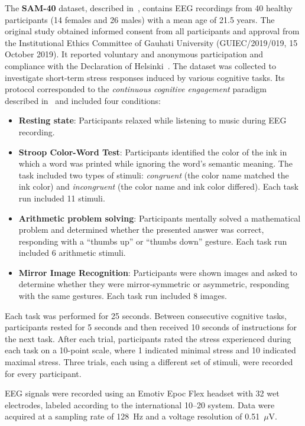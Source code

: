 \documentclass[10pt,letterpaper]{article}
\begin{document}
The \textbf{SAM-40} dataset, described in~\cite{ghosh2022sam40}, contains EEG recordings from 40 healthy participants (14 females and 26 males) with a mean age of 21.5 years. The original study obtained informed consent from all participants and approval from the Institutional Ethics Committee of Gauhati University (GUIEC/2019/019, 15 October 2019). It reported voluntary and anonymous participation and compliance with the Declaration of Helsinki~\cite{ghosh2022sam40}. The dataset was collected to investigate short-term stress responses induced by various cognitive tasks. Its protocol corresponded to the \textit{continuous cognitive engagement} paradigm described in~\cite{chen2025hybrid} and included four conditions:

\begin{itemize}
  \item \textbf{Resting state}: Participants relaxed while listening to music during EEG recording.
  \item \textbf{Stroop Color-Word Test}: Participants identified the color of the ink in which a word was printed while ignoring the word's semantic meaning. The task included two types of stimuli: \textit{congruent} (the color name matched the ink color) and \textit{incongruent} (the color name and ink color differed). Each task run included 11 stimuli.
  \item \textbf{Arithmetic problem solving}: Participants mentally solved a mathematical problem and determined whether the presented answer was correct, responding with a ``thumbs up'' or ``thumbs down'' gesture. Each task run included 6 arithmetic stimuli.
  \item \textbf{Mirror Image Recognition}: Participants were shown images and asked to determine whether they were mirror-symmetric or asymmetric, responding with the same gestures. Each task run included 8 images.
\end{itemize}

Each task was performed for 25 seconds. Between consecutive cognitive tasks, participants rested for 5 seconds and then received 10 seconds of instructions for the next task. After each trial, participants rated the stress experienced during each task on a 10-point scale, where 1 indicated minimal stress and 10 indicated maximal stress. Three trials, each using a different set of stimuli, were recorded for every participant.

EEG signals were recorded using an Emotiv Epoc Flex headset with 32 wet electrodes, labeled according to the international 10--20 system. Data were acquired at a sampling rate of 128~Hz and a voltage resolution of 0.51~$\mu$V.
\end{document}
